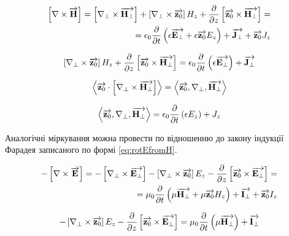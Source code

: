 \textcolor{lightgray}{ \begin{equation*} \begin{aligned}
\crossprod{\nabla}{\vect{H}} = 
\crossprod{\nabla_\perp}{\vect{H_\perp}} + 
\crossprod{\nabla_\perp}{\vect{z_0}} H_z +
\partder{}{z} \crossprod{\vect{z_0}}{\vect{H_\perp}} = \\
= \epsilon_0 \partder{}{t} \left( \epsilon  \vect{E_\perp} + 
\epsilon \vect{z_0} E_z \right) + \vect{J_\perp} + \vect{z_0} J_z
\end{aligned} \end{equation*} }

\begin{equation} \label{eq:rotHt} 
\crossprod{\nabla_\perp}{\vect{z_0}} H_z +
\partder{}{z} \crossprod{\vect{z_0}}{\vect{H_\perp}} =
\epsilon_0 \partder{}{t} \left( \epsilon  \vect{E_\perp} \right) + 
\vect{J_\perp}
\end{equation}

\textcolor{lightgray}{ \begin{equation*} \begin{aligned}
\dotprod{\vect{z_0}}{\crossprod{\nabla_\perp}{\vect{H_\perp}}} =
\triple{\vect{z_0}}{\nabla_\perp}{\vect{H_\perp}}
\end{aligned} \end{equation*} }

\begin{equation} \label{eq:rotHz}
\triple{\vect{z_0}}{\nabla_\perp}{\vect{H_\perp}} = 
\epsilon_0 \partder{}{t} \left( \epsilon  E_z \right) + J_z 
\end{equation}

Аналогічні міркування можна провести по відношенню до закону індукції Фарадея 
записаного по формі \eqref{eq:rotEfromH}.

\textcolor{lightgray}{ \begin{equation*} \begin{aligned}
- \crossprod{\nabla}{\vect{E}} = 
- \crossprod{\nabla_\perp}{\vect{E_\perp}} - 
\crossprod{\nabla_\perp}{\vect{z_0}} E_z -
\partder{}{z} \crossprod{\vect{z_0}}{\vect{E_\perp}} = \\
= \mu_0 \partder{}{t} \left( \mu  \vect{H_\perp} + \mu \vect{z_0} H_z \right) + 
\vect{I_\perp} + \vect{z_0} I_z
\end{aligned} \end{equation*} }

\begin{equation} \label{eq:rotEt} 
- \crossprod{\nabla_\perp}{\vect{z_0}} E_z -
\partder{}{z} \crossprod{\vect{z_0}}{\vect{E_\perp}} = 
\mu_0 \partder{}{t} \left( \mu  \vect{H_\perp} \right) + \vect{I_\perp}
\end{equation}

